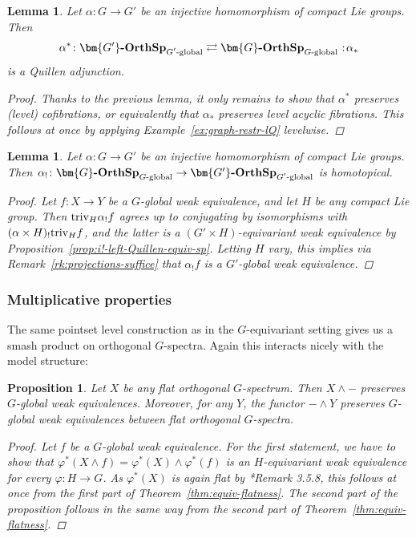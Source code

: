 \documentclass[reqno]{memo-l}
\theoremstyle{mythm}
\newtheorem{lemma}[thm]{Lemma}
\newtheorem{prop}[thm]{Proposition}
\theoremstyle{definition}
\numberwithin{equation}{section}
\renewcommand{\phi}{\varphi}
\newcommand{\cat}[1]{\textbf{\textup{#1}}}
\newcommand{\triv}{{\textup{triv}}}
\let\smashp=\wedge
\newcommand\noloc{%
	\nobreak
	\mspace{6mu plus 1mu}
	{:}
	\nonscript\mkern-\thinmuskip
	\mathpunct{}
	\mspace{2mu}
}
\newcommand{\Gosp}[1]{\cat{$\bm{#1}$-OrthSp}}
\begin{document}
\begin{lemma}\label{lemma:restr-inj-gl-sp-left-Quillen} 
    Let $\alpha\colon G\to G'$ be an \emph{injective} homomorphism of compact Lie groups. Then
    \[
        \alpha^*\colon\Gosp{G'}_\textup{$G'$-global}\rightleftarrows\Gosp{G}_\textup{$G$-global}\noloc \alpha_*
    \]
    is a Quillen adjunction.
    \begin{proof}
        Thanks to the previous lemma, it only remains to show that $\alpha^*$ preserves (level) cofibrations, or equivalently that $\alpha_*$ preserves level acyclic fibrations. This follows at once by applying Example~\ref{ex:graph-restr-lQ} levelwise.
    \end{proof}
\end{lemma}

\begin{lemma}\label{lemma:gl-sp-(co)ind-homotopical}
    Let $\alpha\colon G\to G'$ be an \emph{injective} homomorphism of compact Lie groups. Then $\alpha_!\colon\Gosp{G}_\textup{$G$-global}\to\Gosp{G'}_\textup{$G'$-global}$ is homotopical.
    \begin{proof}
        Let $f\colon X\to Y$ be a $G$-global weak equivalence, and let $H$ be any compact Lie group. Then $\triv_H \alpha_!f$ agrees up to conjugating by isomorphisms with $(\alpha\times H)_!\triv_Hf$, and the latter is a $(G'\times H)$-equivariant weak equivalence by Proposition~\ref{prop:i!-left-Quillen-equiv-sp}. Letting $H$ vary, this implies via Remark~\ref{rk:projections-suffice} that $\alpha_!f$ is a $G'$-global weak equivalence.
    \end{proof}
\end{lemma}

\subsubsection{Multiplicative properties} The same pointset level construction as in the $G$-equivariant setting gives us a smash product on orthogonal $G$-spectra. Again this interacts nicely with the model structure:

\begin{prop}\label{prop:gl-flatness}
    Let $X$ be any flat orthogonal $G$-spectrum. Then $X\smashp{-}$ preserves $G$-global weak equivalences. Moreover, for any $Y$, the functor ${-}\smashp Y$ preserves $G$-global weak equivalences between flat orthogonal $G$-spectra.
    \begin{proof}
        Let $f$ be a $G$-global weak equivalence. For the first statement, we have to show that $\phi^*(X\smashp f)=\phi^*(X)\smashp\phi^*(f)$ is an $H$-equivariant weak equivalence for every $\phi\colon H\to G$. As $\phi^*(X)$ is again flat by \cite{schwede2018global}*{Remark 3.5.8}, this follows at once from the first part of Theorem~\ref{thm:equiv-flatness}. The second part of the proposition follows in the same way from the second part of Theorem~\ref{thm:equiv-flatness}.
    \end{proof}
\end{prop}
\end{document}
